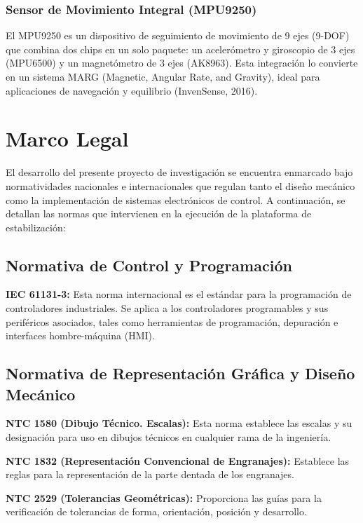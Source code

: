 \documentclass[12pt,letterpaper]{report}
\begin{document}
\subsubsection{Sensor de Movimiento Integral (MPU9250)}

El MPU9250 es un dispositivo de seguimiento de movimiento de 9 ejes (9-DOF) que combina dos chips en un solo paquete: un acelerómetro y giroscopio de 3 ejes (MPU6500) y un magnetómetro de 3 ejes (AK8963). Esta integración lo convierte en un sistema MARG (Magnetic, Angular Rate, and Gravity), ideal para aplicaciones de navegación y equilibrio (InvenSense, 2016).

\section{Marco Legal}

El desarrollo del presente proyecto de investigación se encuentra enmarcado bajo normatividades nacionales e internacionales que regulan tanto el diseño mecánico como la implementación de sistemas electrónicos de control. A continuación, se detallan las normas que intervienen en la ejecución de la plataforma de estabilización:

\subsection{Normativa de Control y Programación}

\textbf{IEC 61131-3:} Esta norma internacional es el estándar para la programación de controladores industriales. Se aplica a los controladores programables y sus periféricos asociados, tales como herramientas de programación, depuración e interfaces hombre-máquina (HMI).

\subsection{Normativa de Representación Gráfica y Diseño Mecánico}

\textbf{NTC 1580 (Dibujo Técnico. Escalas):} Esta norma establece las escalas y su designación para uso en dibujos técnicos en cualquier rama de la ingeniería.

\textbf{NTC 1832 (Representación Convencional de Engranajes):} Establece las reglas para la representación de la parte dentada de los engranajes.

\textbf{NTC 2529 (Tolerancias Geométricas):} Proporciona las guías para la verificación de tolerancias de forma, orientación, posición y desarrollo.
\end{document}
